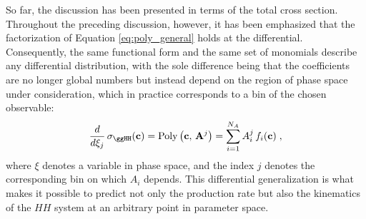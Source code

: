So far, the discussion has been presented in terms of the total cross section. Throughout the preceding discussion, however, it has been emphasized that the factorization of Equation \ref{eq:poly_general} holds at the differential. Consequently, the same functional form and the same set of monomials describe any differential distribution, with the sole difference being that the coefficients are no longer global numbers but instead depend on the region of phase space under consideration, which in practice corresponds to a bin of the chosen observable:
%
\begin{equation}
    \frac{d}{d\xi_j}\,\sigma_{\ggHH}(\mathbf{c})
    = \mathrm{Poly}\left(\mathbf{c},\,\mathbf{A}^{j}\right)
    = \sum_{i=1}^{N_A} A^{j}_i\, f_i(\mathbf{c})\;,
\label{eq:poly_differential}
\end{equation}
%
where $\xi$ denotes a variable in phase space, and the index $j$ denotes the corresponding bin on which $A_i$ depends. This differential generalization is what makes it possible to predict not only the production rate but also the kinematics of the $HH$ system at an arbitrary point in parameter space.\\

